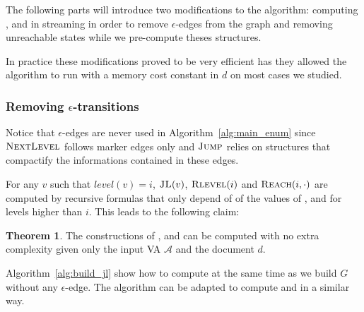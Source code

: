 \documentclass[12px]{article}
\theoremstyle{definition}
\newtheorem{theorem}{Theorem}
\begin{document}


      The following parts will introduce two modifications to the algorithm:
      computing ,  and  in
      streaming in order to remove $\epsilon$-edges from the graph and removing
      unreachable states while we pre-compute theses structures.

      In practice these modifications proved to be very efficient has they
      allowed the algorithm to run with a memory cost constant in $d$ on most
      cases we studied.

      \subsubsection{Removing $\epsilon$-transitions}

        Notice that $\epsilon$-edges are never used in
        Algorithm~\ref{alg:main_enum} since $\textproc{NextLevel}$ follows
        marker edges only and $\textproc{Jump}$ relies on structures that
        compactify the informations contained in these edges.

        For any $v$ such that $level(v) = i$, $\Call{JL}{v}$,
        $\Call{Rlevel}{i}$ and $\Call{Reach}{i, \cdot}$ are computed by
        recursive formulas that only depend of of the values of ,
         and  for levels higher than $i$. This
        leads to the following claim:

        \begin{theorem}
          The constructions of ,  and
           can be computed with no extra complexity given only
          the input VA $\mathcal{A}$ and the document $d$.
        \end{theorem}

        Algorithm~\ref{alg:build_jl} show how to compute  at the
        same time as we build $G$ without any $\epsilon$-edge. The algorithm
        can be adapted to compute  and  in a
        similar way.
\end{document}
